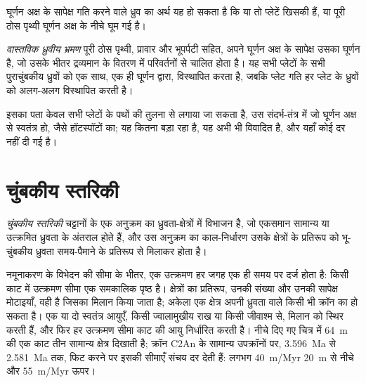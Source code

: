 घूर्णन अक्ष के सापेक्ष गति करने वाले ध्रुव का अर्थ यह हो सकता है कि या तो प्लेटें खिसकी हैं,
या पूरी ठोस पृथ्वी घूर्णन अक्ष के नीचे घूम गई है।

\begin{definition}[वास्तविक ध्रुवीय भ्रमण]\label{def:b3:palaeomagnetism:tpw}
\emph{वास्तविक ध्रुवीय भ्रमण} पूरी ठोस पृथ्वी, प्रावार और भूपर्पटी सहित,
अपने घूर्णन अक्ष के सापेक्ष उसका घूर्णन है, जो उसके भीतर द्रव्यमान के वितरण में
परिवर्तनों से चालित होता है। यह सभी प्लेटों के सभी पुराचुंबकीय ध्रुवों को एक साथ, एक ही घूर्णन द्वारा,
विस्थापित करता है, जबकि प्लेट गति हर प्लेट के ध्रुवों को
अलग-अलग विस्थापित करती है।
\end{definition}

इसका पता केवल सभी प्लेटों के पथों की तुलना से लगाया जा सकता है, उस संदर्भ-तंत्र में
जो घूर्णन अक्ष से स्वतंत्र हो, जैसे हॉटस्पॉटों का; यह कितना बड़ा रहा है, यह अभी भी विवादित है,
और यहाँ कोई दर नहीं दी गई है।

\section{चुंबकीय स्तरिकी}

\begin{definition}[चुंबकीय स्तरिकी]\label{def:b3:palaeomagnetism:magnetostratigraphy}
\emph{चुंबकीय स्तरिकी} चट्टानों के एक अनुक्रम का ध्रुवता-क्षेत्रों में विभाजन है,
जो एकसमान सामान्य या उत्क्रमित ध्रुवता के अंतराल होते हैं, और उस अनुक्रम का काल-निर्धारण
उसके क्षेत्रों के प्रतिरूप को भू-चुंबकीय ध्रुवता
समय-पैमाने के प्रतिरूप से मिलाकर होता है।
\end{definition}

नमूनाकरण के विभेदन की सीमा के भीतर, एक उत्क्रमण हर जगह
एक ही समय पर दर्ज होता है: किसी काट में उत्क्रमण सीमा एक समकालिक पृष्ठ है।
क्षेत्रों का प्रतिरूप, उनकी संख्या और उनकी सापेक्ष मोटाइयाँ, वही है जिसका मिलान किया जाता है;
अकेला एक क्षेत्र अपनी ध्रुवता वाले किसी भी क्रॉन का हो सकता है। एक या दो स्वतंत्र आयुएँ,
किसी ज्वालामुखीय राख या किसी जीवाश्म से, मिलान को स्थिर करती हैं, और फिर
हर उत्क्रमण सीमा काट की आयु निर्धारित करती है। नीचे दिए गए चित्र में
\qty{64}{m} की एक काट तीन सामान्य क्षेत्र दिखाती है; क्रॉन C2An के सामान्य उपक्रॉनों पर,
\qty{3.596}{Ma} से \qty{2.581}{Ma} तक, फिट करने पर इसकी सीमाएँ संचय दर देती हैं: लगभग \qty{40}{m/Myr}
\qty{20}{m} से नीचे और \qty{55}{m/Myr} ऊपर।

